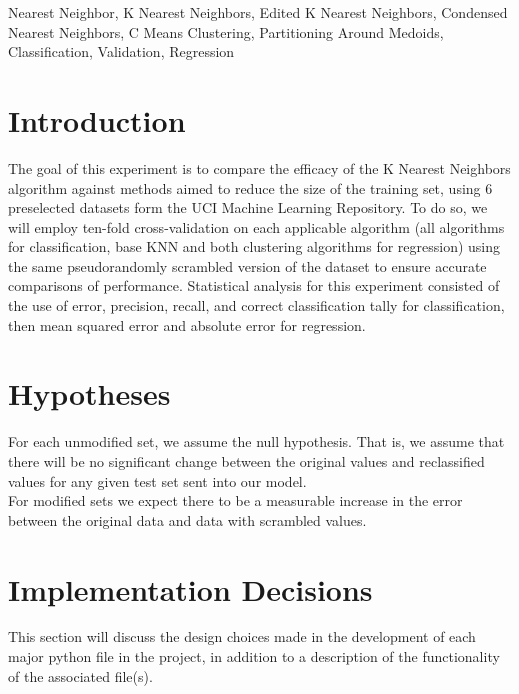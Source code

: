\documentclass[twoside,11pt]{article}
\begin{document}
\begin{keywords}
  Nearest Neighbor, K Nearest Neighbors, Edited K Nearest Neighbors, Condensed Nearest Neighbors, C Means Clustering, Partitioning Around Medoids, Classification, Validation, Regression
\end{keywords}

\section{Introduction}

The goal of this experiment is to compare the efficacy of the K Nearest Neighbors 
algorithm against methods aimed to reduce the size of the training set, using 6 
preselected datasets form the UCI Machine Learning Repository.
\citep{Abalone,Cars,Segmentation,Machine,ForestFires,Wine} To do so, we will employ
ten-fold cross-validation on each applicable algorithm (all algorithms for 
classification, base KNN and both clustering algorithms for regression) using the same
pseudorandomly scrambled version of the dataset to ensure accurate comparisons of performance.
Statistical analysis for this experiment consisted of the use of error, precision, 
recall, and correct classification tally for classification, then mean squared error and 
absolute error for regression.\\


\section{Hypotheses}

For each unmodified set, we assume the null hypothesis. That is, we assume that there will be no 
significant change between the original values and reclassified values for any given test
set sent into our model.\\
For modified sets we expect there to be a measurable increase in the error between the original data and data with scrambled values.

\section{Implementation Decisions}

This section will discuss the design choices made in the development of each major 
python file in the project, in addition to a description of the functionality of 
the associated file(s).
\end{document}
